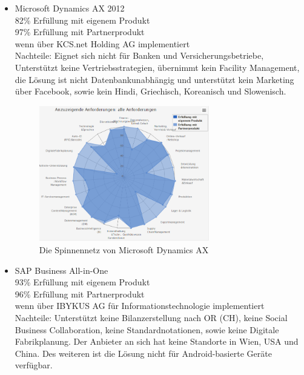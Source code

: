 \documentclass[12pt]{article}
\begin{document}
\begin{itemize}
\item Microsoft Dynamics AX 2012 \\
		82\% Erfüllung mit eigenem Produkt\\
		97\% Erfüllung mit Partnerprodukt\\
		wenn über KCS.net Holding AG implementiert\\
		Nachteile: Eignet sich nicht für Banken und Versicherungsbetriebe, Unterstützt keine Vertriebsstrategien, übernimmt kein Facility Management, die Lösung ist nicht Datenbankunabhängig und unterstützt kein Marketing über Facebook, sowie kein Hindi, Griechisch, Koreanisch und Slowenisch.
		
\begin{figure}[!h]
\centering
\includegraphics[width=0.7\textwidth]{images/matching2}
\caption{Die Spinnennetz von  Microsoft Dynamics AX }
\end{figure}\FloatBarrier
\noindent
\item SAP Business All-in-One\\
		93\% Erfüllung mit eigenem Produkt\\
		96\% Erfüllung mit Partnerprodukt\\		
		wenn über IBYKUS AG für Informationstechnologie implementiert\\
		Nachteile: Unterstützt keine Bilanzerstellung nach OR (CH), keine Social Business Collaboration, keine Standardnotationen, sowie keine Digitale Fabrikplanung. Der Anbieter an sich hat keine Standorte in Wien, USA und China. Des weiteren ist die Lösung nicht für Android-basierte Geräte verfügbar.
		


\end{itemize}
\end{document}
